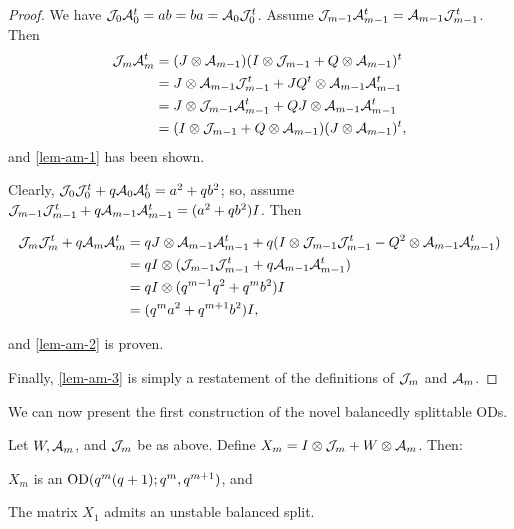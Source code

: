 \documentclass[../../../main]{subfiles}
\begin{document}
\begin{proof}
 We have $\mathcal{J}_0\mathcal{A}_0^t=ab=ba=\mathcal{A}_0\mathcal{J}_0^t$. Assume $\mathcal{J}_{m-1}\mathcal{A}_{m-1}^t=\mathcal{A}_{m-1}\mathcal{J}_{m-1}^t$. Then
 \begin{align*}
  \mathcal{J}_m\mathcal{A}_m^t &= (J \otimes \mathcal{A}_{m-1})(I \otimes \mathcal{J}_{m-1} + Q \otimes \mathcal{A}_{m-1})^t \\
  &= J \otimes \mathcal{A}_{m-1}\mathcal{J}_{m-1}^t + JQ^t \otimes \mathcal{A}_{m-1}\mathcal{A}_{m-1}^t \\
  &= J \otimes \mathcal{J}_{m-1}\mathcal{A}_{m-1}^t + QJ \otimes \mathcal{A}_{m-1}\mathcal{A}_{m-1}^t \\
  &= (I \otimes \mathcal{J}_{m-1} + Q \otimes \mathcal{A}_{m-1})(J \otimes \mathcal{A}_{m-1})^t,
 \end{align*}
 and \ref{lem-am-1} has been shown.
 
 Clearly, $\mathcal{J}_0\mathcal{J}_0^t + q\mathcal{A}_0\mathcal{A}_0^t = a^2+qb^2$; so, assume $\mathcal{J}_{m-1}\mathcal{J}_{m-1}^t + q\mathcal{A}_{m-1}\mathcal{A}_{m-1}^t = (a^2+qb^2)I$. Then
 \begin{small}
 \begin{align*}
  \mathcal{J}_m\mathcal{J}_m^t + q\mathcal{A}_m\mathcal{A}_m^t &= qJ \otimes \mathcal{A}_{m-1}\mathcal{A}_{m-1}^t + q(I \otimes \mathcal{J}_{m-1}\mathcal{J}_{m-1}^t - Q^2 \otimes \mathcal{A}_{m-1}\mathcal{A}_{m-1}^t) \\
  &= qI \otimes (\mathcal{J}_{m-1}\mathcal{J}_{m-1}^t + q\mathcal{A}_{m-1}\mathcal{A}_{m-1}^t) \\
  &= qI \otimes (q^{m-1}q^2 + q^mb^2)I \\
  &= (q^ma^2 + q^{m+1}b^2)I,
 \end{align*}
 \end{small}
 and \ref{lem-am-2} is proven.
 
 Finally, \ref{lem-am-3} is simply a restatement of the definitions of $\mathcal{J}_m$ and $\mathcal{A}_m$.
\end{proof}

We can now present the first construction of the novel balancedly splittable ODs.

\begin{thm}
 Let $W, \mathcal{A}_m$, and $\mathcal{J}_m$ be as above. Define $X_m = I \otimes \mathcal{J}_m + W \otimes \mathcal{A}_m$. Then:
 \begin{defenum}
  \item $X_m$ is an $\text{OD}(q^m(q+1); q^m, q^{m+1})$, and
  \item The matrix $X_1$ admits an unstable balanced split.
 \end{defenum}
\end{thm}
\end{document}
